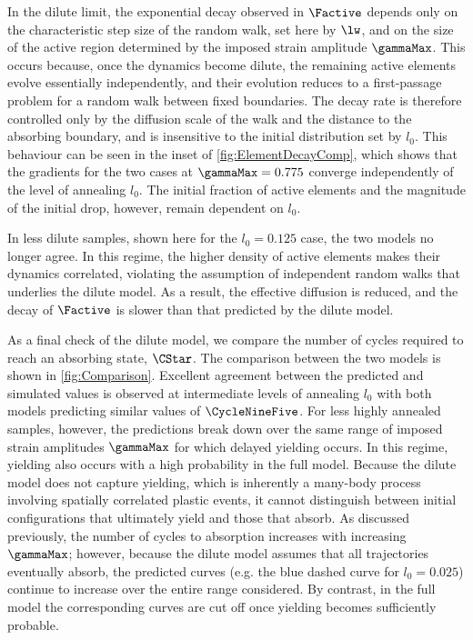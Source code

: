 \documentclass[asymmetricmargins]{library/duthesis}%
\begin{document}
In the dilute limit, the exponential decay observed in $\Factive$ depends only on the characteristic step size of the random walk, set here by $\lw$, and on the size of the active region determined by the imposed strain amplitude $\gammaMax$. This occurs because, once the dynamics become dilute, the remaining active elements evolve essentially independently, and their evolution reduces to a first-passage problem for a random walk between fixed boundaries. The decay rate is therefore controlled only by the diffusion scale of the walk and the distance to the absorbing boundary, and is insensitive to the initial distribution set by $l_0$. This behaviour can be seen in the inset of \cref{fig:ElementDecayComp}, which shows that the gradients for the two cases at $\gammaMax = 0.775$ converge independently of the level of annealing $l_0$. The initial fraction of active elements and the magnitude of the initial drop, however, remain dependent on $l_0$. 

In less dilute samples, shown here for the $l_0 = 0.125$ case, the two models no longer agree. In this regime, the higher density of active elements makes their dynamics correlated, violating the assumption of independent random walks that underlies the dilute model. As a result, the effective diffusion is reduced, and the decay of $\Factive$ is slower than that predicted by the dilute model.

As a final check of the dilute model, we compare the number of cycles required to reach an absorbing state, $\CStar$. The comparison between the two models is shown in \cref{fig:Comparison}. Excellent agreement between the predicted and simulated values is observed at intermediate levels of annealing $l_0$ with both models predicting similar values of $\CycleNineFive$. For less highly annealed samples, however, the predictions break down over the same range of imposed strain amplitudes 
$\gammaMax$ for which delayed yielding occurs. In this regime, yielding also occurs with a high probability in the full model. Because the dilute model does not capture yielding, which is inherently a many-body process involving spatially correlated plastic events, it cannot distinguish between initial configurations that ultimately yield and those that absorb. As discussed previously, the number of cycles to absorption increases with increasing $\gammaMax$; however, because the dilute model assumes that all trajectories eventually absorb, the predicted curves (e.g. the blue dashed curve for $l_0=0.025$) continue to increase over the entire range considered. By contrast, in the full model the corresponding curves are cut off once yielding becomes sufficiently probable.
\end{document}
